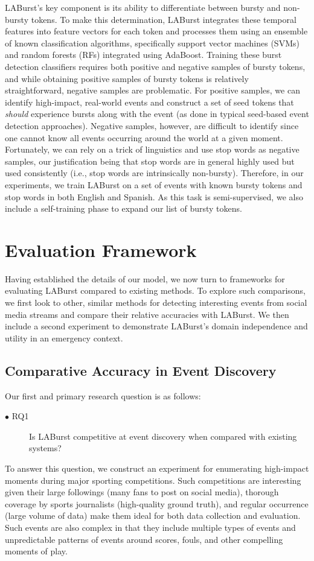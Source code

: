 \documentclass[letterpaper]{article}
\begin{document}
LABurst's key component is its ability to differentiate between bursty and non-bursty tokens.
To make this determination, LABurst integrates these temporal features into feature vectors for each token and processes them using an ensemble of known classification algorithms, specifically support vector machines (SVMs) and random forests (RFs) integrated using AdaBoost.
Training these burst detection classifiers requires both positive and negative samples of bursty tokens, and while obtaining positive samples of bursty tokens is relatively straightforward, negative samples are problematic.
For positive samples, we can identify high-impact, real-world events and construct a set of seed tokens that \emph{should} experience bursts along with the event (as done in typical seed-based event detection approaches).
Negative samples, however, are difficult to identify since one cannot know all events occurring around the world at a given moment.
Fortunately, we can rely on a trick of linguistics and use stop words as negative samples, our justification being that stop words are in general highly used but used consistently (i.e., stop words are intrinsically non-bursty).
Therefore, in our experiments, we train LABurst on a set of events with known bursty tokens and stop words in both English and Spanish.
As this task is semi-supervised, we also include a self-training phase to expand our list of bursty tokens.

\section{Evaluation Framework}
\label{sect:methods}

Having established the details of our model, we now turn to frameworks for evaluating LABurst compared to existing methods.
To explore such comparisons, we first look to other, similar methods for detecting interesting events from social media streams and compare their relative accuracies with LABurst.
We then include a second experiment to demonstrate LABurst's domain independence and utility in an emergency context.

\subsection{Comparative Accuracy in Event Discovery}

Our first and primary research question is as follows:
\begin{description}
\item[$\bullet$ RQ1] Is LABurst competitive at event discovery when compared with existing systems?
\end{description}
To answer this question, we construct an experiment for enumerating high-impact moments during major sporting competitions.
Such competitions are interesting given their large followings (many fans to post on social media), thorough coverage by sports journalists (high-quality ground truth), and regular occurrence (large volume of data) make them ideal for both data collection and evaluation.
Such events are also complex in that they include multiple types of events and unpredictable patterns of events around scores, fouls, and other compelling moments of play.
\end{document}
